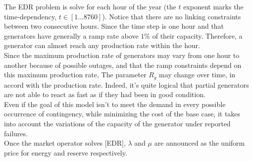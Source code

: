 The EDR problem is solve for each hour of the year (the $t$ exponent marks the time-dependency, \: $t \in \left[ 1 \ldots 8760 \right]$). Notice that there are no linking constraints between two consecutive hours. Since the time step is one hour and that generators have generally a ramp rate above $1\%$ of their capacity. Therefore, a generator can almost reach any production rate within the hour.\\

Since the maximum production rate of generators may vary from one hour to another because of possible outages, and that the ramp constraints depend on this maximum production rate, The parameter $R_g$ may change over time, in accord with the production rate. Indeed, it's quite logical that partial generators are not able to react as fast as if they had been in good condition. \\

Even if the goal of this model isn't to meet the demand in every possible occurrence of contingency, while minimizing the cost of the base case, it takes into account the variations of the capacity of the generator under reported failures. \\

Once the market operator solves [EDR], $\lambda$ and $\mu$ are announced as the uniform price for energy and reserve respectively.